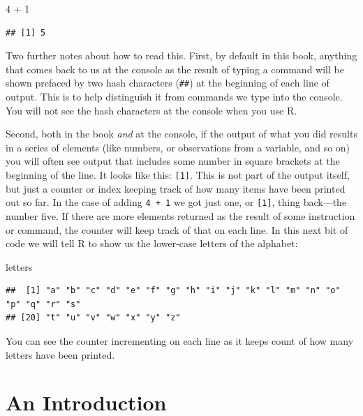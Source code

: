 \documentclass[
]{book}
\newenvironment{Shaded}{\begin{snugshade}}{\end{snugshade}}
\newcommand{\DecValTok}[1]{\textcolor[rgb]{0.00,0.00,0.81}{#1}}
\newcommand{\NormalTok}[1]{#1}
\newcommand{\SpecialCharTok}[1]{\textcolor[rgb]{0.00,0.00,0.00}{#1}}
\begin{document}
\begin{Shaded}
\begin{Highlighting}[]
\DecValTok{4} \SpecialCharTok{+} \DecValTok{1}
\end{Highlighting}
\end{Shaded}

\begin{verbatim}
## [1] 5
\end{verbatim}

Two further notes about how to read this. First, by default in this book, anything that comes back to us at the console as the result of typing a command will be shown prefaced by two hash characters (\texttt{\#\#}) at the beginning of each line of output. This is to help distinguish it from commands we type into the console. You will not see the hash characters at the console when you use R.

Second, both in the book \emph{and} at the console, if the output of what you did results in a series of elements (like numbers, or observations from a variable, and so on) you will often see output that includes some number in square brackets at the beginning of the line. It looks like this: \texttt{{[}1{]}}. This is not part of the output itself, but just a counter or index keeping track of how many items have been printed out so far. In the case of adding \texttt{4\ +\ 1} we got just one, or \texttt{{[}1{]}}, thing back---the number five. If there are more elements returned as the result of some instruction or command, the counter will keep track of that on each line. In this next bit of code we will tell R to show us the lower-case letters of the alphabet:

\begin{Shaded}
\begin{Highlighting}[]
\NormalTok{letters}
\end{Highlighting}
\end{Shaded}

\begin{verbatim}
##  [1] "a" "b" "c" "d" "e" "f" "g" "h" "i" "j" "k" "l" "m" "n" "o" "p" "q" "r" "s"
## [20] "t" "u" "v" "w" "x" "y" "z"
\end{verbatim}

You can see the counter incrementing on each line as it keeps count of how many letters have been printed.

\hypertarget{an-introduction}{%
\chapter{An Introduction}\label{an-introduction}}
\end{document}
